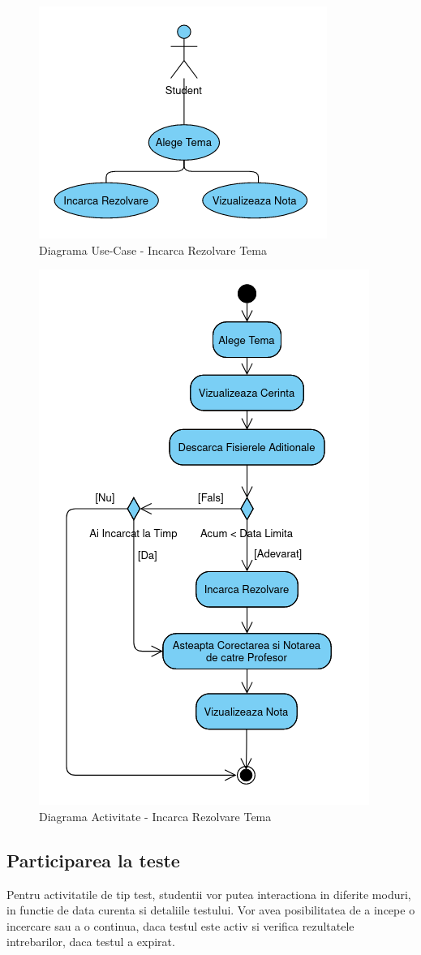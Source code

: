 \documentclass[12pt, a4paper, oneside, romanian]{teza-upb}
\begin{document}
\begin{figure}[H]
\centering
\includegraphics*[width=0.5\columnwidth]{diagrama-use-case-incarca-rezolvare-tema}
\caption{Diagrama Use-Case - Incarca Rezolvare Tema}
\label{diagrama-use-case-incarca-rezolvare-tema}
\end{figure}


\begin{figure}[H]
\centering
\includegraphics*[width=0.55\columnwidth]{diagrama-activitate-incarca-rezolvare-tema}
\caption{Diagrama Activitate - Incarca Rezolvare Tema}
\label{diagrama-activitate-incarca-rezolvare-tema}
\end{figure}


\subsection{Participarea la teste}

Pentru activitatile de tip test, studentii vor putea interactiona in diferite moduri, in functie de data curenta si detaliile testului. Vor avea posibilitatea de a incepe o incercare sau a o continua, daca testul este activ si verifica rezultatele intrebarilor, daca testul a expirat. 
\end{document}
